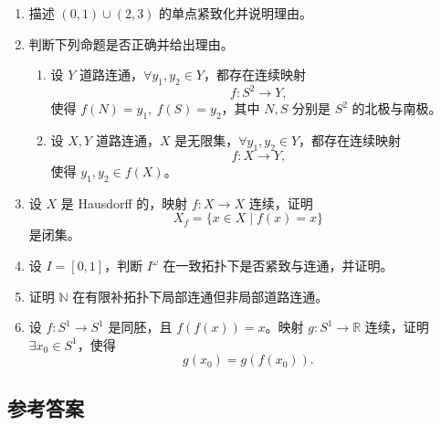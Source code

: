 \documentclass{article}
\newcommand{\R}{\mathbb{R}}
\newcommand{\N}{\mathbb{N}}
\begin{document}
\renewcommand{\labelenumi}{题 \theenumi.}
\begin{enumerate}
  \item 描述 $(0,1)\cup(2,3)$ 的单点紧致化并说明理由。

  \item 判断下列命题是否正确并给出理由。
        \begin{enumerate}
          \item 设 $Y$ 道路连通，$\forall y_1,y_2\in Y$，都存在连续映射
                \[
                  f : S^2 \to Y,
                \]
                使得 $f(N)=y_1,\ f(S)=y_2$，其中 $N,S$ 分别是 $S^2$ 的北极与南极。

          \item 设 $X,Y$ 道路连通，$X$ 是无限集，$\forall y_1,y_2\in Y$，都存在连续映射
                \[
                  f : X \to Y,
                \]
                使得 $y_1,y_2\in f(X)$。
        \end{enumerate}

  \item 设 $X$ 是 Hausdorff 的，映射 $f : X \to X$ 连续，证明
        \[
          X_f=\{x\in X\mid f(x)=x\}
        \]
        是闭集。

  \item 设 $I=[0,1]$，判断 $I^\omega$ 在一致拓扑下是否紧致与连通，并证明。

  \item 证明 $\N$ 在有限补拓扑下局部连通但非局部道路连通。

  \item 设 $f : S^1 \to S^1$ 是同胚，且 $f(f(x))=x$。映射 $g : S^1 \to \R$ 连续，证明 $\exists x_0\in S^1$，使得
        \[
          g(x_0)=g(f(x_0)).
        \]
\end{enumerate}
\renewcommand{\labelenumi}{\theenumi.}

\subsection*{参考答案}
\end{document}

